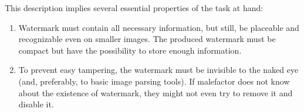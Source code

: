 This description implies several essential properties of the task at hand:
\begin{enumerate}
    \item Watermark must contain all necessary information, but still, be placeable and recognizable even on smaller images. The produced watermark must be compact but have the possibility to store enough information.
    \item To prevent easy tampering, the watermark must be invisible to the naked eye (and, preferably, to basic image parsing tools). If malefactor does not know about the existence of watermark, they might not even try to remove it and disable it.
\end{enumerate}
